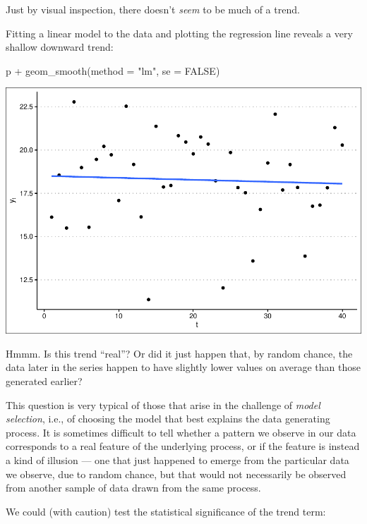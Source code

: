 \documentclass[
]{book}
\newenvironment{Shaded}{\begin{snugshade}}{\end{snugshade}}
\newcommand{\AttributeTok}[1]{\textcolor[rgb]{0.77,0.63,0.00}{#1}}
\newcommand{\ConstantTok}[1]{\textcolor[rgb]{0.00,0.00,0.00}{#1}}
\newcommand{\FunctionTok}[1]{\textcolor[rgb]{0.00,0.00,0.00}{#1}}
\newcommand{\NormalTok}[1]{#1}
\newcommand{\SpecialCharTok}[1]{\textcolor[rgb]{0.00,0.00,0.00}{#1}}
\newcommand{\StringTok}[1]{\textcolor[rgb]{0.31,0.60,0.02}{#1}}
\begin{document}
Just by visual inspection, there doesn't \emph{seem} to be much of a trend.

Fitting a linear model to the data and plotting the regression line reveals a very shallow downward trend:

\begin{Shaded}
\begin{Highlighting}[]
\NormalTok{p }\SpecialCharTok{+} \FunctionTok{geom\_smooth}\NormalTok{(}\AttributeTok{method =} \StringTok{"lm"}\NormalTok{, }\AttributeTok{se =} \ConstantTok{FALSE}\NormalTok{)}
\end{Highlighting}
\end{Shaded}

\includegraphics{graphics/unnamed-chunk-58-1.pdf}

Hmmm. Is this trend ``real''? Or did it just happen that, by random chance, the data later in the series happen to have slightly lower values on average than those generated earlier?

This question is very typical of those that arise in the challenge of \emph{model selection}, i.e., of choosing the model that best explains the data generating process. It is sometimes difficult to tell whether a pattern we observe in our data corresponds to a real feature of the underlying process, or if the feature is instead a kind of illusion --- one that just happened to emerge from the particular data we observe, due to random chance, but that would not necessarily be observed from another sample of data drawn from the same process.

We could (with caution) test the statistical significance of the trend term:
\end{document}
